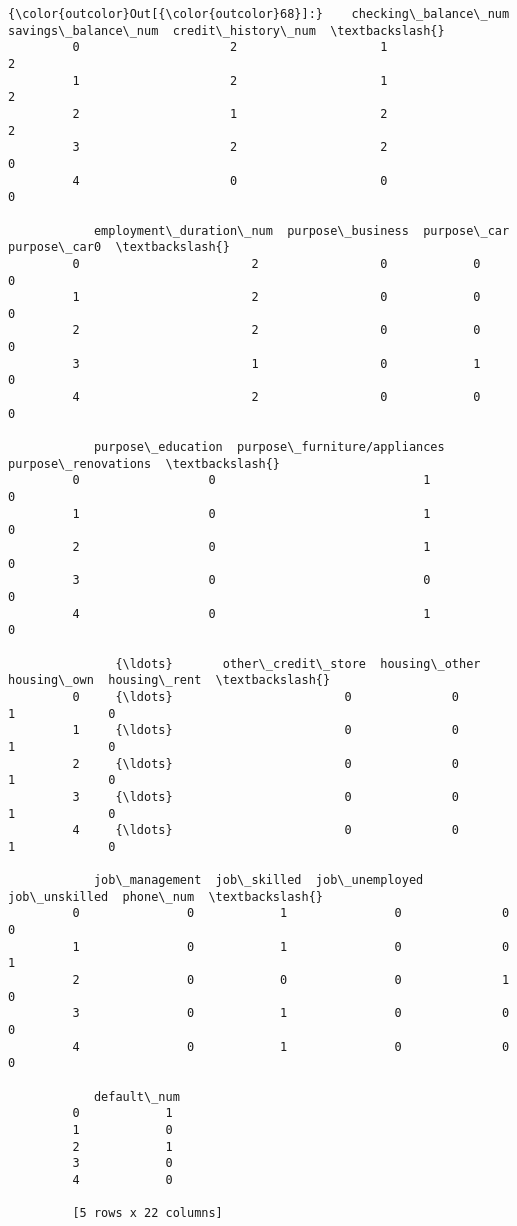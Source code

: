 \documentclass[11pt]{article}
\begin{document}
\begin{Verbatim}[commandchars=\\\{\}]
{\color{outcolor}Out[{\color{outcolor}68}]:}    checking\_balance\_num  savings\_balance\_num  credit\_history\_num  \textbackslash{}
         0                     2                    1                   2   
         1                     2                    1                   2   
         2                     1                    2                   2   
         3                     2                    2                   0   
         4                     0                    0                   0   
         
            employment\_duration\_num  purpose\_business  purpose\_car  purpose\_car0  \textbackslash{}
         0                        2                 0            0             0   
         1                        2                 0            0             0   
         2                        2                 0            0             0   
         3                        1                 0            1             0   
         4                        2                 0            0             0   
         
            purpose\_education  purpose\_furniture/appliances  purpose\_renovations  \textbackslash{}
         0                  0                             1                    0   
         1                  0                             1                    0   
         2                  0                             1                    0   
         3                  0                             0                    0   
         4                  0                             1                    0   
         
               {\ldots}       other\_credit\_store  housing\_other  housing\_own  housing\_rent  \textbackslash{}
         0     {\ldots}                        0              0            1             0   
         1     {\ldots}                        0              0            1             0   
         2     {\ldots}                        0              0            1             0   
         3     {\ldots}                        0              0            1             0   
         4     {\ldots}                        0              0            1             0   
         
            job\_management  job\_skilled  job\_unemployed  job\_unskilled  phone\_num  \textbackslash{}
         0               0            1               0              0          0   
         1               0            1               0              0          1   
         2               0            0               0              1          0   
         3               0            1               0              0          0   
         4               0            1               0              0          0   
         
            default\_num  
         0            1  
         1            0  
         2            1  
         3            0  
         4            0  
         
         [5 rows x 22 columns]
\end{Verbatim}
            
\end{document}
